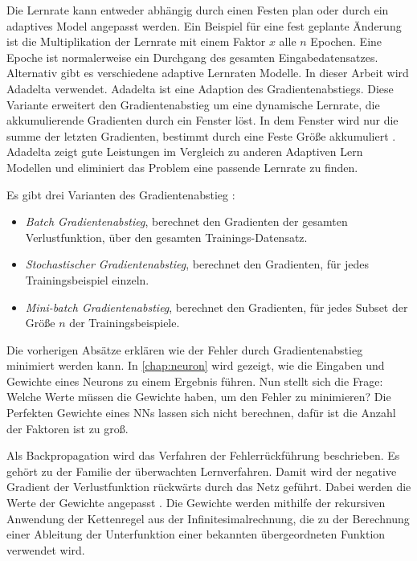 Die Lernrate kann entweder abhängig durch einen Festen plan oder durch ein adaptives Model angepasst werden. Ein Beispiel für eine fest geplante Änderung ist die Multiplikation der Lernrate mit einem Faktor $x$ alle $n$ Epochen. Eine Epoche ist normalerweise ein Durchgang des gesamten Eingabedatensatzes. Alternativ gibt es verschiedene adaptive Lernraten Modelle. In dieser Arbeit wird \zb{} Adadelta verwendet. Adadelta ist eine Adaption des Gradientenabstiegs. Diese Variante erweitert den Gradientenabstieg um eine dynamische Lernrate, die akkumulierende Gradienten durch ein Fenster löst. In dem Fenster wird nur die summe der letzten Gradienten, bestimmt durch eine Feste Größe akkumuliert \cite{Zeiler2012}. Adadelta zeigt gute Leistungen im Vergleich zu anderen Adaptiven Lern Modellen und eliminiert das Problem eine passende Lernrate zu finden.

Es gibt drei Varianten des Gradientenabstieg \cite{Ruder2016}:
\begin{itemize}
  \item \emph{Batch Gradientenabstieg}, berechnet den Gradienten der gesamten Verlustfunktion, über den gesamten Trainings-Datensatz. 
  \item \emph{Stochastischer Gradientenabstieg}, berechnet den Gradienten, für jedes Trainingsbeispiel einzeln.
  \item \emph{Mini-batch Gradientenabstieg}, berechnet den Gradienten, für jedes Subset der Größe $n$ der Trainingsbeispiele.
\end{itemize}

Die vorherigen Absätze erklären wie der Fehler durch Gradientenabstieg minimiert werden kann. In \autoref{chap:neuron} wird gezeigt, wie die Eingaben und Gewichte eines Neurons zu einem Ergebnis führen. Nun stellt sich die Frage: Welche Werte müssen die Gewichte haben, um den Fehler zu minimieren? Die Perfekten Gewichte eines \acp{NN} lassen sich nicht berechnen, dafür ist die Anzahl der Faktoren ist zu groß.

Als Backpropagation wird das Verfahren der Fehlerrückführung beschrieben. Es gehört zu der Familie der überwachten Lernverfahren. Damit wird der negative Gradient der Verlustfunktion rückwärts durch das Netz geführt. Dabei werden die Werte der Gewichte angepasst \cite{Wythoff1993}. Die Gewichte werden mithilfe der rekursiven Anwendung der Kettenregel aus der Infinitesimalrechnung, die zu der Berechnung einer Ableitung der Unterfunktion einer bekannten übergeordneten Funktion verwendet wird.

